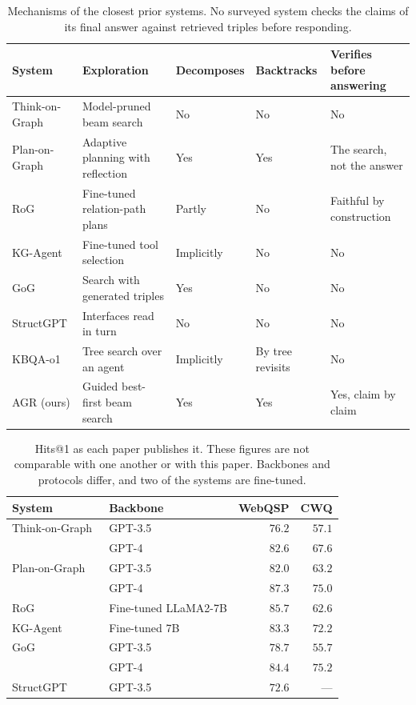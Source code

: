 \begin{table}[!t]
\caption{Mechanisms of the closest prior systems. No surveyed system checks the
  claims of its final answer against retrieved triples before responding.}
\label{tab:mechanisms}
\centering
\small
\begin{tabular}{@{}lllll@{}}
\toprule
System & Exploration & Decomposes & Backtracks & Verifies before answering \\
\midrule
Think-on-Graph & Model-pruned beam search & No & No & No \\
Plan-on-Graph & Adaptive planning with reflection & Yes & Yes & The search, not the answer \\
RoG & Fine-tuned relation-path plans & Partly & No & Faithful by construction \\
KG-Agent & Fine-tuned tool selection & Implicitly & No & No \\
GoG & Search with generated triples & Yes & No & No \\
StructGPT & Interfaces read in turn & No & No & No \\
KBQA-o1 & Tree search over an agent & Implicitly & By tree revisits & No \\
\midrule
AGR (ours) & Guided best-first beam search & Yes & Yes & Yes, claim by claim \\
\bottomrule
\end{tabular}
\end{table}

\begin{table}[!t]
\caption{Hits@1 as each paper publishes it. These figures are not comparable
  with one another or with this paper. Backbones and protocols differ, and two
  of the systems are fine-tuned.}
\label{tab:reported}
\centering
\small
\setlength{\tabcolsep}{4pt}
\begin{tabular}{@{}llrr@{}}
\toprule
System & Backbone & WebQSP & CWQ \\
\midrule
Think-on-Graph~\cite{sun2024think} & GPT-3.5 & $76.2$ & $57.1$ \\
& GPT-4 & $82.6$ & $67.6$ \\
Plan-on-Graph~\cite{chen2024plan} & GPT-3.5 & $82.0$ & $63.2$ \\
& GPT-4 & $87.3$ & $75.0$ \\
RoG~\cite{luo2024reasoning} & Fine-tuned LLaMA2-7B & $85.7$ & $62.6$ \\
KG-Agent~\cite{jiang2024kgagent} & Fine-tuned 7B & $83.3$ & $72.2$ \\
GoG~\cite{xu2024generate} & GPT-3.5 & $78.7$ & $55.7$ \\
& GPT-4 & $84.4$ & $75.2$ \\
StructGPT~\cite{jiang2023structgpt} & GPT-3.5 & $72.6$ & --- \\
\bottomrule
\end{tabular}
\end{table}

\endinput
